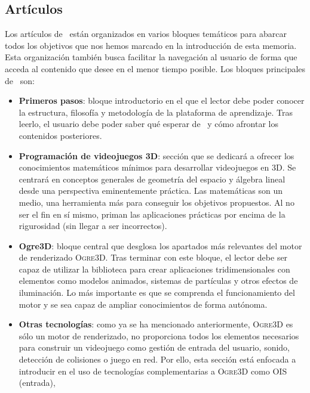 \subsection{Artículos}

Los artículos de \wiki\ están organizados en varios bloques temáticos
para abarcar todos los objetivos que nos hemos marcado en la introducción
de esta memoria. Esta organización también busca facilitar la navegación
al usuario de forma que acceda al contenido que desee en el menor tiempo
posible. Los bloques principales de \wiki\ son:\\

\begin{itemize}
    \itemsep0em
    \item \textbf{Primeros pasos}: bloque introductorio en el que el lector
    debe poder conocer la estructura, filosofía y metodología de la plataforma
    de aprendizaje. Tras leerlo, el usuario debe poder saber qué esperar
    de \wiki\ y cómo afrontar los contenidos posteriores.
    \item \textbf{Programación de videojuegos 3D}: sección que se dedicará
    a ofrecer los conocimientos matemáticos mínimos para desarrollar
    videojuegos en 3D. Se centrará en conceptos generales de geometría
    del espacio y álgebra lineal desde una perspectiva eminentemente práctica.
    Las matemáticas son un medio, una herramienta más para conseguir los objetivos
    propuestos. Al no ser el fin en sí mismo, priman las aplicaciones prácticas
    por encima de la rigurosidad (sin llegar a ser incorrectos).
    \item \textbf{Ogre3D}: bloque central que desglosa los apartados más
    relevantes del motor de renderizado \textsc{Ogre3D}. Tras terminar con
    este bloque, el lector debe ser capaz de utilizar la biblioteca
    para crear aplicaciones tridimensionales con elementos como modelos
    animados, sistemas de partículas y otros efectos de iluminación. Lo más
    importante es que se comprenda el funcionamiento del motor y se sea
    capaz de ampliar conocimientos de forma autónoma.
    \item \textbf{Otras tecnologías}: como ya se ha mencionado anteriormente,
    \textsc{Ogre3D} es sólo un motor de renderizado, no proporciona todos
    los elementos necesarios para construir un videojuego como gestión 
    de entrada del usuario, sonido, detección de colisiones o juego en red.
    Por ello, esta sección está enfocada a introducir en el uso de
    tecnologías complementarias a \textsc{Ogre3D} como \textsc{OIS} (entrada),

\end{itemize}
